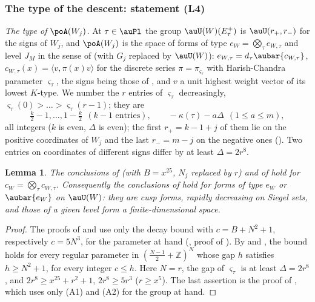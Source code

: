 \documentclass[10pt]{amsart}
\newtheorem{lemma}[theorem]{Lemma}
\theoremstyle{definition}
\theoremstyle{remark}
\newcommand{\Z}{\mathbb Z}
\begin{document}
\subsubsection{The type of the descent: statement (L4)}\label{plf:ss-L4}

\emph{The type of $\poA(W_j)$.} At $\tau\in\auPl$ the group $\auU(W)(E^+_\tau)$ is $\auU(r_+,r_-)$
for the signs of $W_j$, and $\poA(W_j)$ is the space of forms of type $e_W=\bigotimes_\tau e_{W,\tau}$
and level $J_M$ in the sense of {\cite[Definition~8.1]{P49}} (with $G_j$ replaced by $\auU(W)$):
$e_{W,\tau}=d_\tau\aubar{c_{W,\tau}}$, $c_{W,\tau}(x)=\langle v,\pi(x)v\rangle$ for the discrete
series $\pi=\pi_{\varsigma_\tau}$ with Harish-Chandra parameter $\varsigma_\tau$, the signs being those
of {\cite[\S14.3]{P46}}, and $v$ a unit highest weight vector of its lowest $K$-type. We number the
$r$ entries of $\varsigma_\tau$ decreasingly, $\varsigma_\tau(0)>\dots>\varsigma_\tau(r-1)$; they are
\[
\tfrac k2-1,\dots,1-\tfrac k2\ \ (k-1\text{ entries}),\qquad-\kappa(\tau)-a\Delta\ \ (1\le a\le m),
\]
all integers ($k$ is even, $\Delta$ is even); the first $r_+=k-1+j$ of them lie on the positive
coordinates of $W_j$ and the last $r_-=m-j$ on the negative ones ({\cite[\S14.3]{P46}}). Two
entries on coordinates of different signs differ by at least $\Delta=2r^8$.

\begin{lemma}\label{plf:A12}
The conclusions of {\cite[Theorem~3.2]{P49}} (with $B=x^{25}$, $N_j$ replaced by $r$) and of
{\cite[Corollary~3.3]{P49}} hold for $c_W=\bigotimes_\tau c_{W,\tau}$. Consequently the conclusions of
{\cite[Proposition~8.4{\rm(a)}]{P49}} hold for forms of type $e_W$ or $\aubar{e_W}$ on $\auU(W)$: they
are cusp forms, rapidly decreasing on Siegel sets, and those of a given level form a
finite-dimensional space.
\end{lemma}
\begin{proof}
The proofs of {\cite[Theorem~3.2]{P49}} and {\cite[Corollary~3.3]{P49}} use only the decay bound
{\cite[(10)]{P49}} with $c=B+N^2+1$, respectively $c=5N^3$, for the parameter at hand ({\cite[Remark~3.1]{P49}},
proof of {\cite[Corollary~3.3]{P49}}). By {\cite[Theorem~3.17]{P49}} and {\cite[Theorem~5.6]{P51}}, the bound holds
for every regular parameter in $(\frac{N-1}2+\Z)^N$ whose gap $h$ satisfies $h\ge N^2+1$, for every
integer $c\le h$. Here $N=r$, the gap of $\varsigma_\tau$ is at least $\Delta=2r^8$, and
$2r^8\ge x^{25}+r^2+1$, $2r^8\ge5r^3$ ($r\ge x^5$). The last assertion is the proof of
{\cite[Proposition~8.4(a)]{P49}}, which uses only (A1) and (A2) for the group at hand.
\end{proof}
\end{document}
